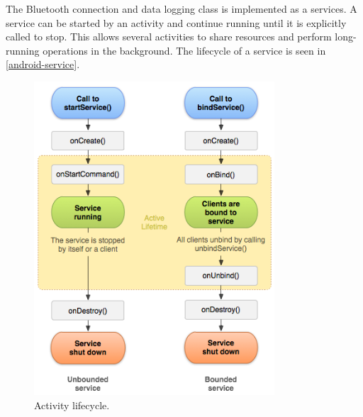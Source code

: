 The Bluetooth connection and data logging class is implemented as a services\cite{android-service}. A service can be started by an activity and continue running until it is explicitly called to stop. This allows several activities to share resources and perform long-running operations in the background. The lifecycle of a service is seen in \autoref{android-service}.
\begin{figure}[H]
\centering
\includegraphics[width=0.8\textwidth]{Figures/service_lifecycle.png}
\caption{Activity lifecycle.}
\label{android-service}
\end{figure}

